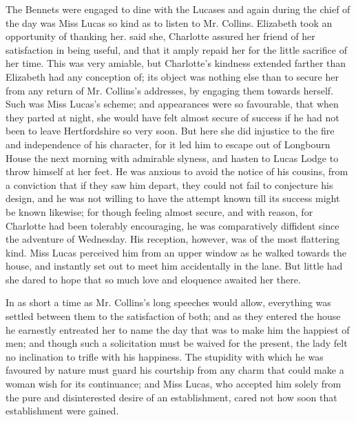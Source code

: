 The Bennets were engaged to dine with the Lucases and again during the chief of the day was Miss Lucas so kind as to listen to Mr. Collins. Elizabeth took an opportunity of thanking her.  said she,  Charlotte assured her friend of her satisfaction in being useful, and that it amply repaid her for the little sacrifice of her time. This was very amiable, but Charlotte's kindness extended farther than Elizabeth had any conception of; its object was nothing else than to secure her from any return of Mr. Collins's addresses, by engaging them towards herself. Such was Miss Lucas's scheme; and appearances were so favourable, that when they parted at night, she would have felt almost secure of success if he had not been to leave Hertfordshire so very soon. But here she did injustice to the fire and independence of his character, for it led him to escape out of Longbourn House the next morning with admirable slyness, and hasten to Lucas Lodge to throw himself at her feet. He was anxious to avoid the notice of his cousins, from a conviction that if they saw him depart, they could not fail to conjecture his design, and he was not willing to have the attempt known till its success might be known likewise; for though feeling almost secure, and with reason, for Charlotte had been tolerably encouraging, he was comparatively diffident since the adventure of Wednesday. His reception, however, was of the most flattering kind. Miss Lucas perceived him from an upper window as he walked towards the house, and instantly set out to meet him accidentally in the lane. But little had she dared to hope that so much love and eloquence awaited her there.

In as short a time as Mr. Collins's long speeches would allow, everything was settled between them to the satisfaction of both; and as they entered the house he earnestly entreated her to name the day that was to make him the happiest of men; and though such a solicitation must be waived for the present, the lady felt no inclination to trifle with his happiness. The stupidity with which he was favoured by nature must guard his courtship from any charm that could make a woman wish for its continuance; and Miss Lucas, who accepted him solely from the pure and disinterested desire of an establishment, cared not how soon that establishment were gained.

